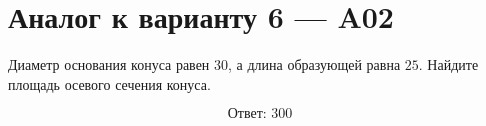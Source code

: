 \documentclass[12pt,a4paper]{article}
\begin{document}
\section*{Аналог к варианту 6 — A02}

Диаметр основания конуса равен \(30\), а длина образующей равна \(25\). Найдите площадь осевого сечения конуса.

\begin{center}
\end{center}

\[
\boxed{\text{Ответ: }300}
\]
\end{document}
